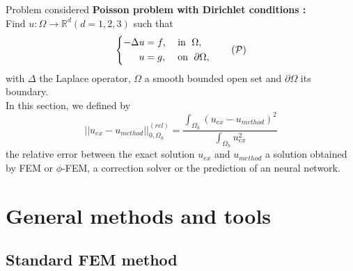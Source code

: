 \documentclass[compress,10pt,xcolor={table,dvipsnames},t]{beamer}
\begin{document}
	\begin{frame}{Problem considered}
		\textbf{Poisson problem with Dirichlet conditions :} \\
		Find $u : \Omega \rightarrow \mathbb{R}^d (d=1,2,3)$ such that
		\begin{equation}
			\left\{
			\begin{aligned}
				-\Delta u &= f, \; &&\text{in } \; \Omega, \\
				u&=g, \; &&\text{on } \; \partial\Omega,
			\end{aligned}
			\right. \tag{$\mathcal{P}$} \label{pb_initial}
		\end{equation}
		with $\Delta$ the Laplace operator, $\Omega$ a smooth bounded open set and $\partial\Omega$ its boundary. \\
		In this section, we defined by
		\begin{equation*}
			||u_{ex}-u_{method}||_{0,\Omega_h}^{(rel)}=\frac{\int_{\Omega_h} (u_{ex}-u_{method})^2}{\int_{\Omega_h} u_{ex}^2}
		\end{equation*}
		the relative error between the exact solution $u_{ex}$ and $u_{method}$ a solution obtained by FEM or $\phi$-FEM, a correction solver or the prediction of an neural network.
		
	\end{frame}

	\section{General methods and tools}
	
	\subsection{Standard FEM method}
	
\end{document}
